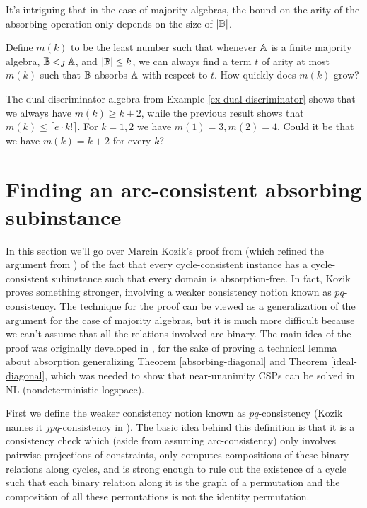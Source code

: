 \documentclass[letterpaper,11pt]{article}
\begin{document}
\begin{rem} It's intriguing that in the case of majority algebras, the bound on the arity of the absorbing operation only depends on the size of $|\mathbb{B}|$.
\end{rem}

\begin{prob} Define $m(k)$ to be the least number such that whenever $\mathbb{A}$ is a finite majority algebra, $\mathbb{B} \lhd_J \mathbb{A}$, and $|\mathbb{B}| \le k$, we can always find a term $t$ of arity at most $m(k)$ such that $\mathbb{B}$ absorbs $\mathbb{A}$ with respect to $t$. How quickly does $m(k)$ grow?
\end{prob}

The dual discriminator algebra from Example \ref{ex-dual-discriminator} shows that we always have $m(k) \ge k+2$, while the previous result shows that $m(k) \le \lceil e\cdot k!\rceil$. For $k = 1,2$ we have $m(1) = 3, m(2) = 4$. Could it be that we have $m(k) = k+2$ for every $k$?





\section{Finding an arc-consistent absorbing subinstance}

In this section we'll go over Marcin Kozik's proof from \cite{pq-consistency} (which refined the argument from \cite{slac}) of the fact that every cycle-consistent instance has a cycle-consistent subinstance such that every domain is absorption-free. In fact, Kozik proves something stronger, involving a weaker consistency notion known as $pq$-consistency. The technique for the proof can be viewed as a generalization of the argument for the case of majority algebras, but it is much more difficult because we can't assume that all the relations involved are binary. The main idea of the proof was originally developed in \cite{nu-pathwidth}, for the sake of proving a technical lemma about absorption generalizing Theorem \ref{absorbing-diagonal} and Theorem \ref{ideal-diagonal}, which was needed to show that near-unanimity CSPs can be solved in NL (nondeterministic logspace).

First we define the weaker consistency notion known as $pq$-consistency (Kozik names it $jpq$-consistency in \cite{pq-consistency}). The basic idea behind this definition is that it is a consistency check which (aside from assuming arc-consistency) only involves pairwise projections of constraints, only computes compositions of these binary relations along cycles, and is strong enough to rule out the existence of a cycle such that each binary relation along it is the graph of a permutation and the composition of all these permutations is not the identity permutation.%
\end{document}
